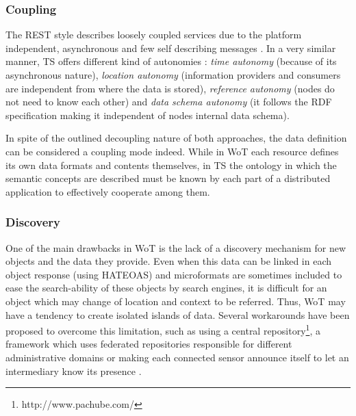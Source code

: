 \subsubsection{Coupling}
\label{sec:coupling}
The REST style describes loosely coupled services due to the platform independent, asynchronous and few self describing messages
\cite{pautasso_why_2009}. In a very similar manner, TS offers different kind of autonomies \cite{krummenacher_www_2005}:
\textit{time autonomy} (because of its asynchronous nature), \textit{location autonomy} (information providers and consumers are independent
from where the data is stored), \textit{reference autonomy} (nodes do not need to know each other) and
\textit{data schema autonomy} (it follows the RDF specification making it independent of nodes internal data schema).

In spite of the outlined decoupling nature of both approaches, the data definition can be considered a coupling mode indeed.
While in WoT each resource defines its own data formats and contents themselves, in TS the ontology in which the semantic
concepts are described must be known by each part of a distributed application to effectively cooperate among them.

\subsubsection{Discovery}
One of the main drawbacks in WoT is the lack of a discovery mechanism for new objects and the data they provide. Even when this data can be linked
in each object response (using HATEOAS) and microformats are sometimes included to ease the search-ability of these objects by search engines, it is difficult for an
object which may change of location and context to be referred. Thus, WoT may have a tendency to create isolated islands of data. Several workarounds
have been proposed to overcome this limitation, such as using a central repository\footnote{http://www.pachube.com/}, a framework which uses federated
repositories responsible for different administrative domains \cite{stirbu_towards_2008} or making each connected sensor announce itself to let an
intermediary know its presence \cite{kamilaris_smart_2010}.

